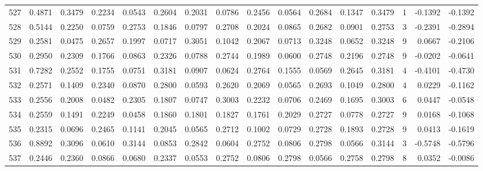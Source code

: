 \begin{tabular}{lrrrrrrrrrrrrrrr}
527 &      0.4871 &  0.3479 &  0.2234 &  0.0543 &  0.2604 &  0.2031 &  0.0786 &  0.2456 &  0.0564 &  0.2684 &   0.1347 &     0.3479 &      1 &                   -0.1392 &                    -0.1392 \\
528 &      0.5144 &  0.2250 &  0.0759 &  0.2753 &  0.1846 &  0.0797 &  0.2708 &  0.2024 &  0.0865 &  0.2682 &   0.0901 &     0.2753 &      3 &                   -0.2391 &                    -0.2894 \\
529 &      0.2581 &  0.0475 &  0.2657 &  0.1997 &  0.0717 &  0.3051 &  0.1042 &  0.2067 &  0.0713 &  0.3248 &   0.0652 &     0.3248 &      9 &                    0.0667 &                    -0.2106 \\
530 &      0.2950 &  0.2309 &  0.1766 &  0.0863 &  0.2326 &  0.0788 &  0.2744 &  0.1989 &  0.0600 &  0.2748 &   0.2196 &     0.2748 &      9 &                   -0.0202 &                    -0.0641 \\
531 &      0.7282 &  0.2552 &  0.1755 &  0.0751 &  0.3181 &  0.0907 &  0.0624 &  0.2764 &  0.1555 &  0.0569 &   0.2645 &     0.3181 &      4 &                   -0.4101 &                    -0.4730 \\
532 &      0.2571 &  0.1409 &  0.2340 &  0.0870 &  0.2800 &  0.0593 &  0.2620 &  0.2069 &  0.0565 &  0.2693 &   0.1049 &     0.2800 &      4 &                    0.0229 &                    -0.1162 \\
533 &      0.2556 &  0.2008 &  0.0482 &  0.2305 &  0.1807 &  0.0747 &  0.3003 &  0.2232 &  0.0706 &  0.2469 &   0.1695 &     0.3003 &      6 &                    0.0447 &                    -0.0548 \\
534 &      0.2559 &  0.1491 &  0.2249 &  0.0458 &  0.1860 &  0.1801 &  0.1827 &  0.1761 &  0.2029 &  0.2727 &   0.0778 &     0.2727 &      9 &                    0.0168 &                    -0.1068 \\
535 &      0.2315 &  0.0696 &  0.2465 &  0.1141 &  0.2045 &  0.0565 &  0.2712 &  0.1002 &  0.0729 &  0.2728 &   0.1893 &     0.2728 &      9 &                    0.0413 &                    -0.1619 \\
536 &      0.8892 &  0.3096 &  0.0610 &  0.3144 &  0.0853 &  0.2842 &  0.0604 &  0.2752 &  0.0806 &  0.2798 &   0.0566 &     0.3144 &      3 &                   -0.5748 &                    -0.5796 \\
537 &      0.2446 &  0.2360 &  0.0866 &  0.0680 &  0.2337 &  0.0553 &  0.2752 &  0.0806 &  0.2798 &  0.0566 &   0.2758 &     0.2798 &      8 &                    0.0352 &                    -0.0086 \\

\end{tabular}
